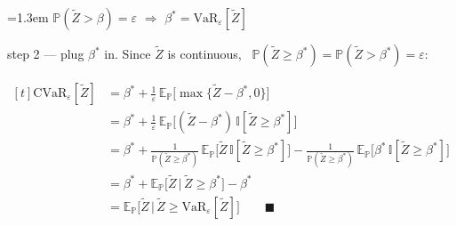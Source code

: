 \documentclass[10pt]{article}
\newenvironment{board}{%
  \par\vspace{4pt}
  \begingroup\leftskip=1.3em\relax\parskip=2pt\relax}{%
  \par\endgroup\vspace{4pt}}
\newcommand{\E}{\mathbb{E}}
\newcommand{\Prob}{\mathbb{P}}
\newcommand{\VaR}{\mathrm{VaR}}
\newcommand{\CVaR}{\mathrm{CVaR}}
\newcommand{\ind}[1]{\mathbb{I}[#1]}
\newcommand{\Zt}{\tilde Z}
\begin{document}
\begin{board}
\quad $\Prob(\Zt > \beta) = \varepsilon$ \qquad $\Rightarrow$ \qquad $\beta^{*} = \VaR_{\varepsilon}[\Zt]$
\vspace{5pt}

\begin{minipage}{\dimexpr\linewidth-1.3em\relax}
\quad step 2 --- plug $\beta^{*}$ in. \quad Since $\Zt$ is continuous, \ $\Prob(\Zt \ge \beta^{*}) = \Prob(\Zt > \beta^{*}) = \varepsilon$:
\vspace{3pt}

\quad $\begin{aligned}[t]
  \CVaR_{\varepsilon}[\Zt]
    &= \beta^{*} + \frac{1}{\varepsilon}\,\E_{\Prob}\big[\max\{\Zt - \beta^{*}, 0\}\big] \\
    &= \beta^{*} + \frac{1}{\varepsilon}\,\E_{\Prob}\big[(\Zt - \beta^{*})\,\ind{\Zt \ge \beta^{*}}\big] \\
    &= \beta^{*} + \frac{1}{\Prob(\Zt \ge \beta^{*})}\,\E_{\Prob}\big[\Zt\,\ind{\Zt \ge \beta^{*}}\big]
       - \frac{1}{\Prob(\Zt \ge \beta^{*})}\,\E_{\Prob}\big[\beta^{*}\,\ind{\Zt \ge \beta^{*}}\big] \\
    &= \beta^{*} + \E_{\Prob}\big[\Zt \,\big|\, \Zt \ge \beta^{*}\big] - \beta^{*} \\
    &= \E_{\Prob}\big[\Zt \,\big|\, \Zt \ge \VaR_{\varepsilon}[\Zt]\big] \qquad \blacksquare
\end{aligned}$
\end{minipage}
\end{board}
\end{document}
